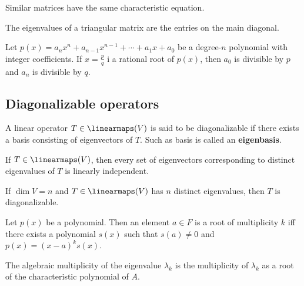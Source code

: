 \begin{lemma}
  Similar matrices have the same characteristic equation.
\end{lemma}

\begin{lemma}
  The eigenvalues of a triangular matrix are the entries on the main diagonal.
\end{lemma}

\begin{theorem}
  Let $p(x) = a_n x^n + a_{n-1} x^{n - 1} + \cdots + a_1 x + a_0$ be a degree-$n$ polynomial with integer coefficients. If $x = \frac{p}{q}$ i a rational root of $p(x)$, then $a_0$ is divisible by $p$ and $a_n$ is divisible by $q$.
\end{theorem}

\subsection{Diagonalizable operators}

\begin{definition}
  A linear operator $T \in \linearmaps(V)$ is said to be diagonalizable if there exists a basis consisting of eigenvectors of $T$. Such as basis is called an \textbf{eigenbasis}.
\end{definition}

\begin{lemma}
  If $T \in \linearmaps(V)$, then every set of eigenvectors corresponding to distinct eigenvalues of $T$ is linearly independent.
\end{lemma}

\begin{lemma}
  If $\dim V = n$ and $T \in \linearmaps(V)$ has $n$ distinct eigenvalues, then $T$ is diagonalizable.
\end{lemma}

\begin{definition}
  Let $p(x)$ be a polynomial. Then an element $a \in F$ is a root of multiplicity $k$ iff there exists a polynomial $s(x)$ such that $s(a) \neq 0$ and $p(x) = (x - a)^k s(x)$.
\end{definition}

\begin{definition}
  The algebraic multiplicity of the eigenvalue $\lambda_k$ is the multiplicity of $\lambda_k$ as a root of the characteristic polynomial of $A$.
\end{definition}

